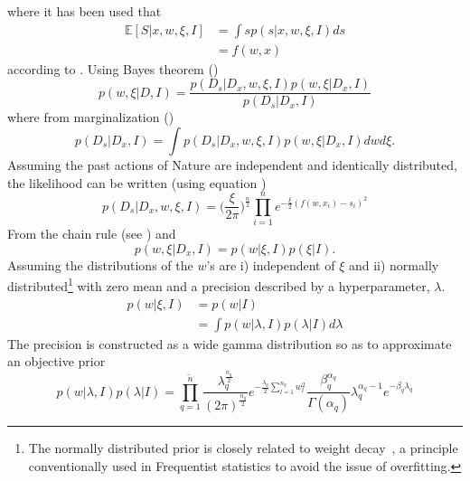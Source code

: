 where it has been used that
\begin{equation}
	\begin{split}
		\mathbb{E}[S|x,w,\xi,I] &= \int s p(s|x,w,\xi,I) ds\\
		&= f(w,x)
	\end{split}
\end{equation}
according to . Using Bayes theorem ()
\begin{equation}
	p(w,\xi|D,I) = \frac{p(D_s|D_x,w,\xi,I)p(w,\xi|D_x,I)}{p(D_s|D_x,I)}
	\label{eq:bayes2}
\end{equation}
where from marginalization ()
\begin{equation}
	p(D_s|D_x,I) = \int p(D_s|D_x,w,\xi,I)p(w,\xi|D_x,I) dw d\xi.
\end{equation}
Assuming the past actions of Nature are independent and identically distributed, the likelihood can be written (using equation )
\begin{equation}
	p(D_s|D_x,w,\xi,I) = \bigg(\frac{\xi}{2\pi}\bigg)^\frac{n}{2}\prod_{i=1}^n e^{-\frac{\xi}{2}(f(w,x_i)-s_i)^2}
	\label{reg:likelihood}
\end{equation}
From the chain rule (see ) and 
\begin{equation}
	p(w,\xi|D_x,I) = p(w|\xi,I)p(\xi|I).
\end{equation}
Assuming the distributions of the $w$'s are i) independent of $\xi$ and ii) normally distributed\footnote{The normally distributed prior is closely related to weight decay~\citep{Plaut1986}, a principle conventionally used in Frequentist statistics to avoid the issue of overfitting.} with zero mean and a precision described by a hyperparameter, $\lambda$. 	 
\begin{equation}
	\begin{split}
		p(w|\xi,I) & = p(w|I)\\
		& = \int p(w|\lambda,I)p(\lambda|I)d\lambda
	\end{split}
	\label{eq:prior1}
\end{equation}
The precision is constructed as a wide gamma distribution so as to approximate an objective prior
\begin{equation}
	p(w|\lambda,I)p(\lambda|I)
	= \prod_{q=1}^{\tilde{n}} \frac{\lambda_q^\frac{n_q}{2}}{(2\pi)^\frac{n_q}{2}}e^{-\frac{\lambda_q}{2}\sum_{l=1}^{n_q}w_l^2}\frac{\beta_q^{\alpha_q}}{\Gamma(\alpha_q)}\lambda_q^{\alpha_q-1}e^{-\beta_q \lambda_q}
	\label{eq:prior}
\end{equation}
